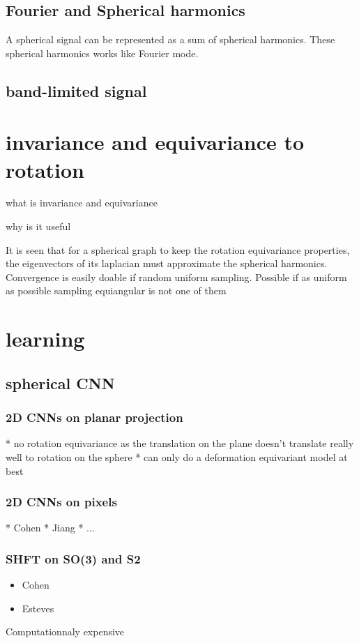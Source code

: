 \documentclass[11pt]{report}
\begin{document}
\subsection{Fourier and Spherical harmonics}
A spherical signal can be represented as a sum of spherical harmonics. These spherical harmonics  works like Fourier mode.

\subsection{band-limited signal} %
 
\section{invariance and equivariance to rotation}
what is invariance and equivariance

why is it useful

It is seen that for a spherical graph to keep the rotation equivariance properties, the eigenvectors of its laplacian must approximate the spherical harmonics. Convergence is easily doable if random uniform sampling. %
Possible if as uniform as possible sampling
equiangular is not one of them
\section{learning}
\subsection{spherical CNN}
\subsubsection{2D CNNs on planar projection}
* no rotation equivariance as the translation on the plane doesn't translate really well to rotation on the sphere
* can only do a deformation equivariant model at best
\subsubsection{2D CNNs on pixels}
* Cohen
* Jiang
* ...
\subsubsection{SHFT on SO(3) and S2}
\begin{itemize}
    \item Cohen
    \item Esteves
\end{itemize}
Computationnaly expensive
\end{document}
